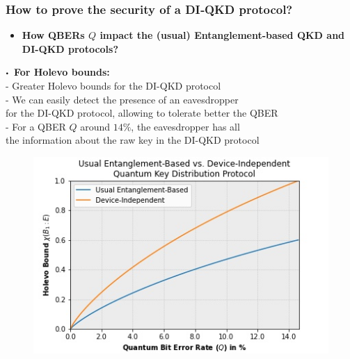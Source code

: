 \documentclass{beamer}
\newcommand\sbullet[1][.5]{\mathbin{\vcenter{\hbox{\scalebox{#1}{$\bullet$}}}}}
\begin{document}
    \begin{frame}
        \frametitle{\large How to prove the security of a DI‑QKD protocol?}

        \vspace{4ex}
        \begin{itemize}
            \item \textbf{How QBERs $Q$ impact the (usual) Entanglement-based QKD and DI-QKD protocols?}
        \end{itemize}
        
        \begin{minipage}{0.5\textwidth}
            \centering
            \vspace{0.5ex}
            \scriptsize
            $\sbullet$\, \textbf{For Holevo bounds:}\\
            \vspace{0.25ex}
            \tiny
            - Greater Holevo bounds for the DI-QKD protocol\\
            - We can easily detect the presence of an eavesdropper\\for the DI-QKD protocol, allowing to tolerate better the QBER\\
            - For a QBER $Q$ around $14\%$, the eavesdropper has all\\ the information about the raw key in the DI-QKD protocol
            \vspace{-1.2ex}
            \begin{figure}
                \includegraphics[width=\linewidth]{figures/presentation/jpg/holevo-bounds-quantum-bit-error-rate-plot.jpg}
                \vspace{-4ex}
            \caption{\color{blue}{Figure 2: }\color{black}{Holevo bounds with respect to QBER $Q$}}

\end{figure}
\end{minipage}
\end{frame}
\end{document}
